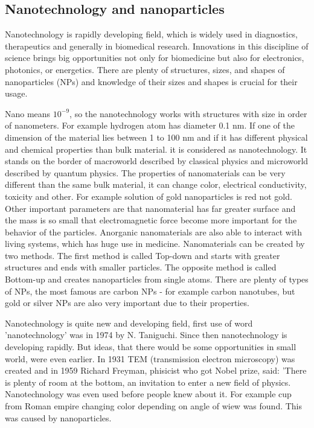     \pagestyle{plain}

\subsection{Nanotechnology and nanoparticles}

        Nanotechnology is rapidly developing field, which is widely used in diagnostics, therapeutics and generally in biomedical research.
        Innovations in this discipline of science brings big opportunities not only for biomedicine but also for electronics, photonics, or energetics.
        There are plenty of structures, sizes, and shapes of nanoparticles (NPs) and knowledge of their sizes and shapes is crucial for their usage. \cite{35, 36, 37}

        Nano means $10^{-9}$, so the nanotechnology works with structures with size in order of nanometers. For example hydrogen atom has diameter 0.1 nm.
        If one of the dimension of the material lies between 1 to 100 nm and if it has different physical and chemical properties than bulk material.
        it is considered as nanotechnology. It stands on the border of macroworld described by classical physics and microworld described by quantum physics.
        The properties of nanomaterials can be very different than the same bulk material, it can change color, electrical conductivity, toxicity and other.
        For example solution of gold nanoparticles is red not gold. Other important parameters are that nanomaterial has far greater surface and the mass is
        so small that electromagnetic force become more important for the behavior of the particles. Anorganic nanomaterials are also able to interact
        with living systems, which has huge use in medicine. Nanomaterials can be created by two methods. The first method is called Top-down and
        starts with greater structures and ends with smaller particles. The opposite method is called Bottom-up and creates nanoparticles from single atoms.
        There are plenty of types of NPs, the most famous are carbon NPs - for example carbon nanotubes, but gold or silver NPs are also very important
        due to their properties. \cite{9, 10, 11, 12, 13, 14, 33, 34}

        Nanotechnology is quite new and developing field, first use of word 'nanotechnology' was in 1974 by N. Taniguchi. Since then nanotechnology is developing rapidly.
        But ideas, that there would be some opportunities in small world, were even earlier. In 1931 TEM (transmission electron microscopy) was created and
        in 1959 Richard Freyman, phisicist who got Nobel prize, said: 'There is plenty of room at the bottom, an invitation to enter a new field of physics.
        Nanotechnology was even used before people knew about it. For example cup from Roman empire changing color depending on angle of wiew was found.
        This was caused by nanoparticles. \cite{11, 12, 33, 34}

